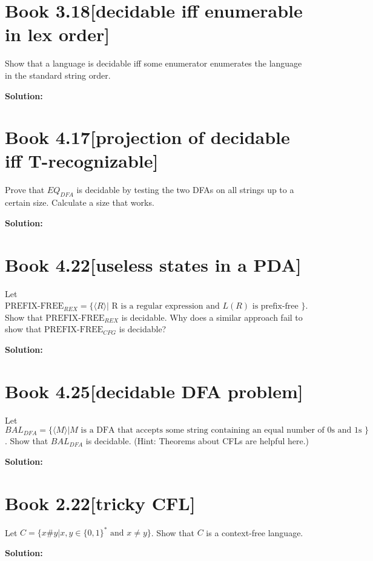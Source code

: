 \documentclass[11pt]{article}
\newenvironment{question}[2]
{\newpage\section{#1\texorpdfstring{\hfill}{horizontal spacing}{\rm\normalsize #2}}}{}
\newenvironment{solution}
{\textbf{Solution: }\color{blue}}
{\color{black}}
\begin{document}
\begin{question}{Book 3.18}{[decidable iff enumerable in lex order]}

Show that a language is decidable iff some enumerator enumerates the language in the standard string order.

\begin{solution}



\end{solution}
\end{question}


\begin{question}{Book 4.17}{[projection of decidable iff T-recognizable]}

Prove that \(EQ_{DFA}\) is decidable by testing the two DFAs on all strings up to a certain size. Calculate a size that works.

\begin{solution}



\end{solution}
\end{question}


\begin{question}{Book 4.22}{[useless states in a PDA]}

Let \(\text{PREFIX-FREE}_{REX} = \{ \langle R \rangle | \text{ R is a regular expression and } L(R) \text{ is prefix-free } \}\). Show that \(\text{PREFIX-FREE}_{REX}\) is decidable. Why does a similar approach fail to show that \(\text{PREFIX-FREE}_{CFG}\) is decidable?

\begin{solution}



\end{solution}
\end{question}


\begin{question}{Book 4.25}{[decidable DFA problem]}

Let \(BAL_{DFA} = \{ \langle M \rangle | M \text{ is a DFA that accepts some string containing an equal number of 0s and 1s } \}\). Show that \(BAL_{DFA}\) is decidable. (Hint: Theorems about CFLs are helpful here.)

\begin{solution}



\end{solution}
\end{question}


\begin{question}{Book 2.22}{[tricky CFL]}

Let \(C= \{ x\#y | x,y \in \{ 0,1 \}^* \text{ and } x \neq y \}\). Show that \(C\) is a context-free language.

\begin{solution}



\end{solution}
\end{question}
\end{document}
